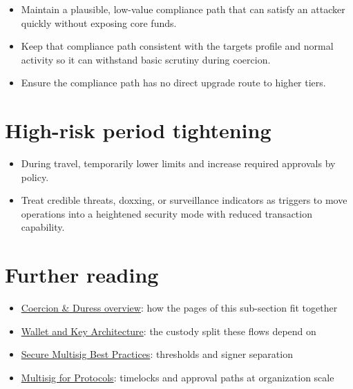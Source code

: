 \begin{itemize}
\tightlist
\item
  Maintain a plausible, low-value compliance path that can satisfy an attacker quickly without exposing core funds.
\item
  Keep that compliance path consistent with the target\textquotesingle s profile and normal activity so it can withstand basic scrutiny during coercion.
\item
  Ensure the compliance path has no direct upgrade route to higher tiers.
\end{itemize}

\section{High-risk period tightening}\label{high-risk-period-tightening}

\begin{itemize}
\tightlist
\item
  During travel, temporarily lower limits and increase required approvals by policy.
\item
  Treat credible threats, doxxing, or surveillance indicators as triggers to move operations into a heightened security mode with reduced transaction capability.
\end{itemize}

\section{Further reading}\label{further-reading-8}

\begin{itemize}
\tightlist
\item
  \href{https://frameworks.securityalliance.dev/physical-security/coercion-and-duress/overview}{Coercion \& Duress overview}: how the pages of this sub-section fit together
\item
  \href{https://frameworks.securityalliance.dev/physical-security/coercion-and-duress/wallet-and-key-architecture}{Wallet and Key Architecture}: the custody split these flows depend on
\item
  \href{https://frameworks.securityalliance.dev/wallet-security/secure-multisig-best-practices}{Secure Multisig Best Practices}: thresholds and signer separation
\item
  \href{https://frameworks.securityalliance.dev/multisig-for-protocols/overview}{Multisig for Protocols}: timelocks and approval paths at organization scale
\end{itemize}

